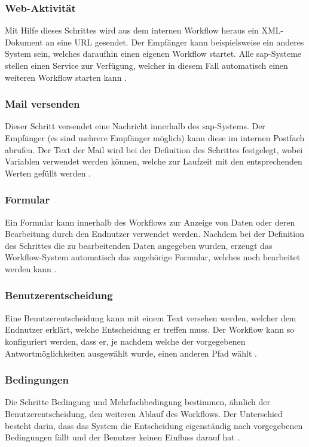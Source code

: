 \subsubsection{Web-Aktivität}
Mit Hilfe dieses Schrittes wird aus dem internen Workflow heraus ein XML-Dokument an eine URL gesendet. Der Empfänger kann beispielsweise ein anderes System sein, welches daraufhin einen eigenen Workflow startet. Alle \gls{sap}-Systeme stellen einen Service zur Verfügung, welcher in diesem Fall automatisch einen weiteren Workflow starten kann \cite{SAPHelp}.

\subsubsection{Mail versenden}
Dieser Schritt versendet eine Nachricht innerhalb des \gls{sap}-Systems. Der Empfänger (es sind mehrere Empfänger möglich) kann diese im internen Postfach abrufen. Der Text der Mail wird bei der Definition des Schrittes festgelegt, wobei Variablen verwendet werden können, welche zur Laufzeit mit den entsprechenden Werten gefüllt werden \cite{SAPHelp}.

\subsubsection{Formular}
Ein Formular kann innerhalb des Workflows zur Anzeige von Daten oder deren Bearbeitung durch den Endnutzer verwendet werden. Nachdem bei der Definition des Schrittes die zu bearbeitenden Daten angegeben wurden, erzeugt das Workflow-System automatisch das zugehörige Formular, welches noch bearbeitet werden kann \cite{SAPHelp}. 

\subsubsection{Benutzerentscheidung}
Eine Benutzerentscheidung kann mit einem Text versehen werden, welcher dem Endnutzer erklärt, welche Entscheidung er treffen muss. Der Workflow kann so konfiguriert werden, dass er, je nachdem welche der vorgegebenen Antwortmöglichkeiten ausgewählt wurde, einen anderen Pfad wählt \cite{SAPHelp}.

\subsubsection{Bedingungen}
Die Schritte Bedingung und Mehrfachbedingung bestimmen, ähnlich der Benutzerentscheidung, den weiteren Ablauf des Workflows. Der Unterschied besteht darin, dass das System die Entscheidung eigenständig nach vorgegebenen Bedingungen fällt und der Benutzer keinen Einfluss darauf hat \cite{SAPHelp}.

